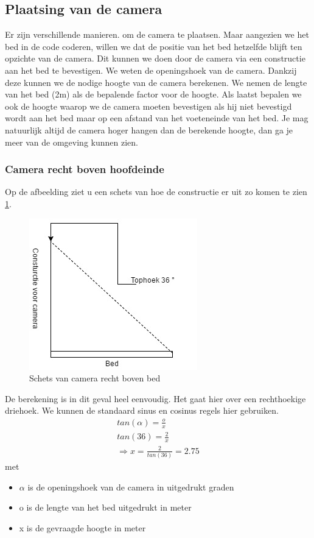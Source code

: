 \subsection {Plaatsing van de camera}
\label{mRefSTP}
Er zijn verschillende manieren. om de camera te plaatsen. Maar aangezien we het bed in de code coderen, willen we dat de positie van het bed hetzelfde blijft ten opzichte van de camera. Dit kunnen we doen door de camera via een constructie aan het bed te bevestigen. We weten de openingshoek van de camera. Dankzij deze kunnen we de nodige hoogte van de camera berekenen. We nemen de lengte van het bed (2m) als de bepalende factor voor de hoogte. Als laatst bepalen we ook de hoogte waarop we de camera moeten bevestigen als hij niet bevestigd wordt aan het bed maar op een afstand van het voeteneinde van het bed. Je mag natuurlijk altijd de camera hoger hangen dan de berekende hoogte, dan ga je meer van de omgeving kunnen zien.

\subsubsection{Camera recht boven hoofdeinde}
Op de afbeelding ziet u een schets van hoe de constructie er uit zo komen te zien \ref{imgCBB}.
\begin{figure}[hbp]
	\includegraphics[scale=0.7]{CamBovenBed}
	\caption{Schets van camera recht boven bed}
	\label{imgCBB}
\end{figure}
De berekening is in dit geval heel eenvoudig. Het gaat hier over een rechthoekige driehoek. We kunnen de standaard sinus en cosinus regels hier gebruiken.
\begin{gather}
tan(\alpha) =\frac{o}{x}\\
tan(36) = \frac{2}{x} \\
\Rightarrow x = \frac{2}{tan(36)} = 2.75
\end{gather}
met
\begin{itemize}
	\item $\alpha$ is de openingshoek van de camera in uitgedrukt graden
	\item o is de lengte van het bed uitgedrukt in meter
	\item x is de gevraagde hoogte in meter
\end{itemize}

